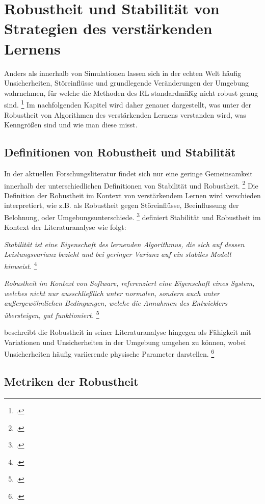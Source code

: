 \section{Robustheit und Stabilität von Strategien des verstärkenden Lernens}

Anders als innerhalb von Simulationen lassen sich in der echten Welt häufig Unsicherheiten, Störeinflüsse und grundlegende Veränderungen der Umgebung wahrnehmen, für welche die Methoden des RL standardmäßig nicht robust genug sind. \footcite[Vgl.][S. 1]{Moos.2022}
Im nachfolgenden Kapitel wird daher genauer dargestellt, was unter der Robustheit von Algorithmen des verstärkenden Lernens verstanden wird, was Kenngrößen sind und wie man diese misst.

\subsection{Definitionen von Robustheit und Stabilität}

In der aktuellen Forschungsliteratur findet sich nur eine geringe Gemeinsamkeit innerhalb der unterschiedlichen Definitionen von Stabilität und Robustheit. \footcite[Vgl.][S. 5]{Pullum.2022}
Die Definition der Robustheit im Kontext von verstärkendem Lernen wird verschieden interpretiert, wie z.B. als Robustheit gegen Störeinflüsse, Beeinflussung der Belohnung, oder Umgebungsunterschiede. \footcite[Vgl.][S. 2]{Liu.2023}
\cite[]{Pullum.2022} definiert Stabilität und Robustheit im Kontext der Literaturanalyse wie folgt:

\textit{Stabilität ist eine Eigenschaft des lernenden Algorithmus, die sich auf dessen Leistungsvarianz bezieht und bei geringer Varianz auf ein stabiles Modell hinweist.} \footcite[Vgl.][S. 5]{Pullum.2022}

\textit{Robustheit im Kontext von Software, referenziert eine Eigenschaft eines System, welches nicht nur ausschließlich unter normalen, sondern auch unter außergewöhnlichen Bedingungen, welche die Annahmen des Entwicklers übersteigen, gut funktioniert.} \footcite[Vgl.][S. 5]{Pullum.2022}

\cite[]{Moos.2022} beschreibt die Robustheit in seiner Literaturanalyse hingegen als Fähigkeit mit Variationen und Unsicherheiten in der Umgebung umgehen zu können, wobei Unsicherheiten häufig variierende physische Parameter darstellen. \footcite[Vgl.][S. 1]{Moos.2022}

\subsection{Metriken der Robustheit}

